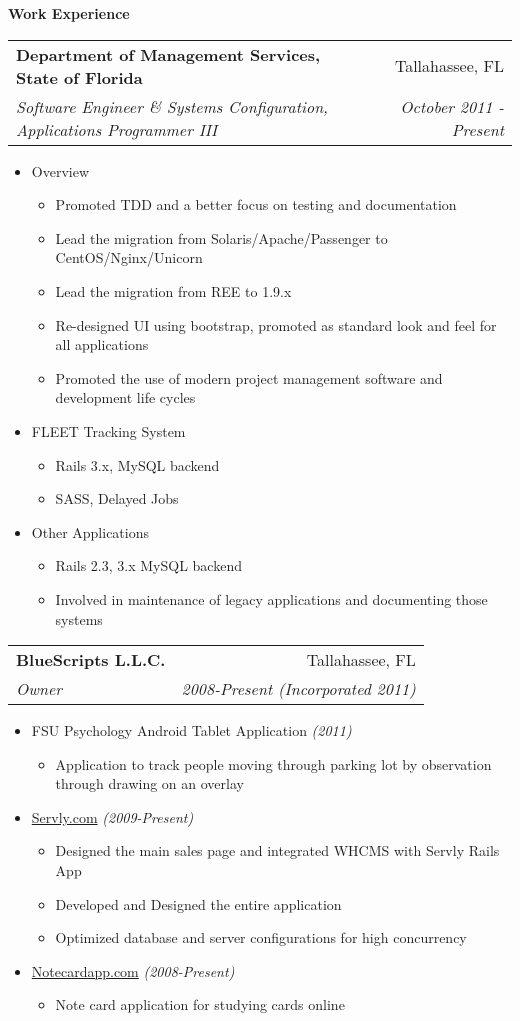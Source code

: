 \documentclass[letterpaper,11pt]{article}
\makeatletter
\newcommand{\resitem}[1]{\item #1 \vspace{-2pt}}
\newcommand{\resheading}[1]{{\large \colorbox{myblue}{\begin{minipage}{\textwidth}{\textbf{#1 \vphantom{p\^{E}}}}\end{minipage}}}}
\newcommand{\ressubheading}[4]{
\begin{tabular*}{7.0in}{l@{\extracolsep{\fill}}r}
		\textbf{#1} & #2 \\
		\textit{#3} & \textit{#4} \\
\end{tabular*}\vspace{-6pt}}
\makeatother
\begin{document}
\resheading{Work Experience}
\ressubheading{Department of Management Services, State of Florida}{Tallahassee, FL}{Software Engineer \& Systems Configuration, Applications Programmer III}{October 2011 - Present}
\begin{itemize}
        \resitem{Overview} 
        \begin{itemize}
                \resitem{Promoted TDD and a better focus on testing and documentation}
                \resitem{Lead the migration from Solaris/Apache/Passenger to CentOS/Nginx/Unicorn}
                \resitem{Lead the migration from REE to 1.9.x}
                \resitem{Re-designed UI using bootstrap, promoted as standard look and feel for all applications}
                \resitem{Promoted the use of modern project management software and development life cycles}
        \end{itemize}
        \resitem{FLEET Tracking System}
        \begin{itemize}
                \resitem{Rails 3.x, MySQL backend}
                \resitem{SASS, Delayed Jobs}
        \end{itemize}
        \resitem{Other Applications}
        \begin{itemize}
                \resitem{Rails 2.3, 3.x MySQL backend}
                \resitem{Involved in maintenance of legacy applications and documenting those systems}
        \end{itemize}
\end{itemize}

\pagebreakwithheader

\ressubheading{BlueScripts L.L.C.}{Tallahassee, FL}{Owner}{2008-Present (Incorporated 2011)}
\begin{itemize}
        \resitem{FSU Psychology Android Tablet Application \textit{(2011)}}
        \begin{itemize} 
                \resitem{Application to track people moving through parking lot by observation through drawing on an overlay}
        \end{itemize}

        \resitem{\url{Servly.com} \textit{(2009-Present)}}
        \begin{itemize} 
                \resitem{Designed the main sales page and integrated WHCMS with Servly Rails App}
                \resitem{Developed and Designed the entire application}
                \resitem{Optimized database and server configurations for high concurrency}
        \end{itemize}

        \resitem{\url{Notecardapp.com} \textit{(2008-Present)}}
        \begin{itemize}
                \resitem{Note card application for studying cards online}
        \end{itemize}
\end{itemize}
\end{document}
